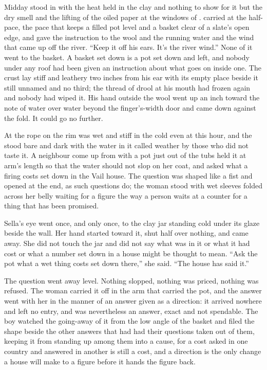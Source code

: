 
Midday stood in  with the heat held in the clay and nothing to show for it but the dry smell and the lifting of the oiled paper at the windows of .  carried  at the half-pace, the pace that keeps a filled pot level and a basket clear of a slate's open edge, and gave the instruction to the wool and the running water and the wind that came up off the river. “Keep it off his ears. It's the river wind.” None of it went to the basket. A basket set down is a pot set down and left, and nobody under any roof had been given an instruction about what goes on inside one. The crust lay stiff and leathery two inches from his ear with its empty place beside it still unnamed and no third; the thread of drool at his mouth had frozen again and nobody had wiped it. His hand outside the wool went up an inch toward the note of water over water beyond the finger's-width door and came down against the fold. It could go no further.

At  the rope on the rim was wet and stiff in the cold even at this hour, and the  stood bare and dark with the water in it called weather by those who did not taste it. A neighbour come up from  with a pot just out of the tubs held it at arm's length so that the water should not slop on her coat, and asked what a firing costs set down in the Vail house. The question was shaped like a fist and opened at the end, as such questions do; the woman stood with wet sleeves folded across her belly waiting for a figure the way a person waits at a counter for a thing that has been promised.

Sella's eye went once, and only once, to the clay jar standing cold under its glaze beside the wall. Her hand started toward it, shut half over nothing, and came away. She did not touch the jar and did not say what was in it or what it had cost or what a number set down in a house might be thought to mean. “Ask the pot what a wet thing costs set down there,” she said. “The house has said it.”

The question went away level. Nothing slopped, nothing was priced, nothing was refused. The woman carried it off in the arm that carried the pot, and the answer went with her in the manner of an answer given as a direction: it arrived nowhere and left no entry, and was nevertheless an answer, exact and not spendable. The boy watched the going-away of it from the low angle of the basket and filed the shape beside the other answers that had had their questions taken out of them, keeping it from standing up among them into a cause, for a cost asked in one country and answered in another is still a cost, and a direction is the only change a house will make to a figure before it hands the figure back.

